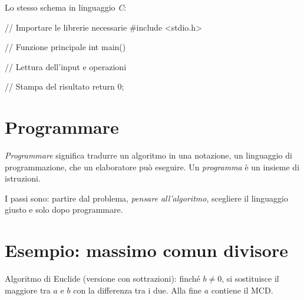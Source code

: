 \documentclass[11pt,a4paper]{article}
\begin{document}
Lo stesso schema in linguaggio \textit{C}:
\begin{codice}
// Importare le librerie necessarie
#include <stdio.h>

// Funzione principale
int main() {
    // Lettura dell'input e operazioni

    // Stampa del risultato
    return 0;
}
\end{codice}

\section{Programmare}

\begin{definizione}
\emph{Programmare} significa tradurre un algoritmo in una notazione, un
linguaggio di programmazione, che un elaboratore può eseguire. Un
\emph{programma} è un insieme di istruzioni.
\end{definizione}

I passi sono: partire dal problema, \emph{pensare all'algoritmo}, scegliere il
linguaggio giusto e solo dopo programmare.

\section{Esempio: massimo comun divisore}

Algoritmo di Euclide (versione con sottrazioni): finché $b \neq 0$, si
sostituisce il maggiore tra $a$ e $b$ con la differenza tra i due. Alla fine $a$
contiene il MCD.

\begin{center}
\end{center}
\end{document}
